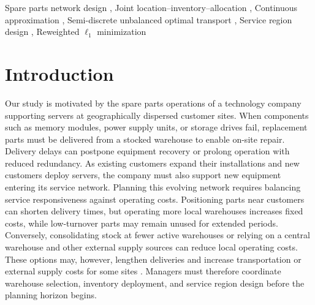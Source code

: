 \documentclass[a4paper,fleqn]{cas-sc}
\theoremstyle{remark}
\theoremstyle{plain}
\begin{document}


\begin{keywords}
Spare parts network design \sep
Joint location--inventory--allocation \sep
Continuous approximation \sep
Semi-discrete unbalanced optimal transport \sep
Service region design \sep
Reweighted $\ell_1$ minimization
\end{keywords}

\maketitle

\section{Introduction}

Our study is motivated by the spare parts operations of a technology company supporting servers at geographically dispersed customer sites. When components such as memory modules, power supply units, or storage drives fail, replacement parts must be delivered from a stocked warehouse to enable on-site repair. Delivery delays can postpone equipment recovery or prolong operation with reduced redundancy. As existing customers expand their installations and new customers deploy servers, the company must also support new equipment entering its service network. Planning this evolving network requires balancing service responsiveness against operating costs. Positioning parts near customers can shorten delivery times, but operating more local warehouses increases fixed costs, while low-turnover parts may remain unused for extended periods. Conversely, consolidating stock at fewer active warehouses or relying on a central warehouse and other external supply sources can reduce local operating costs. These options may, however, lengthen deliveries and increase transportation or external supply costs for some sites \citep{candas2020service,chu2025integrated}. Managers must therefore coordinate warehouse selection, inventory deployment, and service region design before the planning horizon begins.
\end{document}
